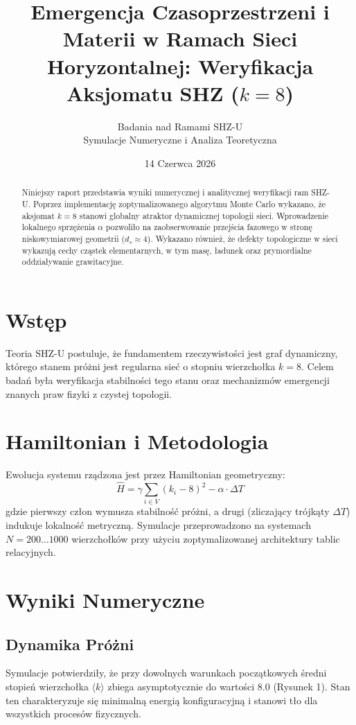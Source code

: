 \documentclass[11pt,a4paper,twocolumn]{article}
\title{\textbf{Emergencja Czasoprzestrzeni i Materii w Ramach Sieci Horyzontalnej: Weryfikacja Aksjomatu SHZ ($k=8$)}}
\author{Badania nad Ramami SHZ-U \\ \small Symulacje Numeryczne i Analiza Teoretyczna}
\date{14 Czerwca 2026}
\begin{document}
\maketitle

\begin{abstract}
Niniejszy raport przedstawia wyniki numerycznej i analitycznej weryfikacji ram SHZ-U. Poprzez implementację zoptymalizowanego algorytmu Monte Carlo wykazano, że aksjomat $k=8$ stanowi globalny atraktor dynamicznej topologii sieci. Wprowadzenie lokalnego sprzężenia $\alpha$ pozwoliło na zaobserwowanie przejścia fazowego w stronę niskowymiarowej geometrii ($d_s \approx 4$). Wykazano również, że defekty topologiczne w sieci wykazują cechy cząstek elementarnych, w tym masę, ładunek oraz prymordialne oddziaływanie grawitacyjne.
\end{abstract}

\section{Wstęp}
Teoria SHZ-U postuluje, że fundamentem rzeczywistości jest graf dynamiczny, którego stanem próżni jest regularna sieć o stopniu wierzchołka $k=8$. Celem badań była weryfikacja stabilności tego stanu oraz mechanizmów emergencji znanych praw fizyki z czystej topologii.

\section{Hamiltonian i Metodologia}
Ewolucja systemu rządzona jest przez Hamiltonian geometryczny:
\begin{equation}
\hat{H} = \gamma \sum_{i \in V} (k_i - 8)^2 - \alpha \cdot \Delta T
\end{equation}
gdzie pierwszy człon wymusza stabilność próżni, a drugi (zliczający trójkąty $\Delta T$) indukuje lokalność metryczną. Symulacje przeprowadzono na systemach $N=200 \dots 1000$ wierzchołków przy użyciu zoptymalizowanej architektury tablic relacyjnych.

\section{Wyniki Numeryczne}

\subsection{Dynamika Próżni}
Symulacje potwierdziły, że przy dowolnych warunkach początkowych średni stopień wierzchołka $\langle k \rangle$ zbiega asymptotycznie do wartości $8.0$ (Rysunek 1). Stan ten charakteryzuje się minimalną energią konfiguracyjną i stanowi tło dla wszystkich procesów fizycznych.
\end{document}
